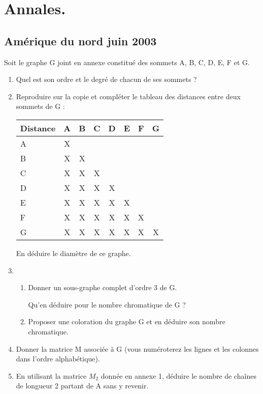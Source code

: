 \section{Annales.}  
\subsection{Amérique du nord juin 2003}

Soit le graphe G joint en annexe constitué des sommets A, B, C, D, E, F et G.

\begin{enumerate} 
\item Quel est son ordre et le degré de chacun de ses sommets ?
\item Reproduire sur la copie et compléter le tableau des distances entre deux sommets de G :

\medskip
\begin{center} 
\begin{tabular}{|l|c|c|c|c|c|c|c|}\hline
Distance    &    A  &   B   &   C   &   D   &   E   &   F   &   G   \\ \hline
A           &    X  &       &       &       &       &       &       \\ \hline
B           &    X  &   X   &       &       &       &       &       \\ \hline
C           &    X  &   X   &   X   &       &       &       &       \\ \hline
D           &    X  &   X   &   X   &   X   &       &       &       \\ \hline
E           &    X  &   X   &   X   &   X   &   X   &       &       \\ \hline
F           &    X  &   X   &   X   &   X   &   X   &   X   &       \\ \hline
G           &    X  &   X   &   X   &   X   &   X   &   X   &   X   \\ \hline
\end{tabular}
\end{center}

\medskip
En déduire le diamètre de ce graphe.
\item 
   \begin{enumerate} 
   \item Donner un sous-graphe complet d'ordre 3 de G.

Qu'en déduire pour le nombre chromatique de G ?
   \item Proposer une coloration du graphe G et en déduire son nombre chromatique.
   \end{enumerate}
\item Donner la matrice M associée à G (vous numéroterez les lignes et les  colonnes dans l'ordre alphabétique).
\item En utilisant la matrice $ M_2$ donnée en annexe 1, déduire le nombre de chaînes de longueur 2 partant de A sans y revenir.
\end{enumerate}

